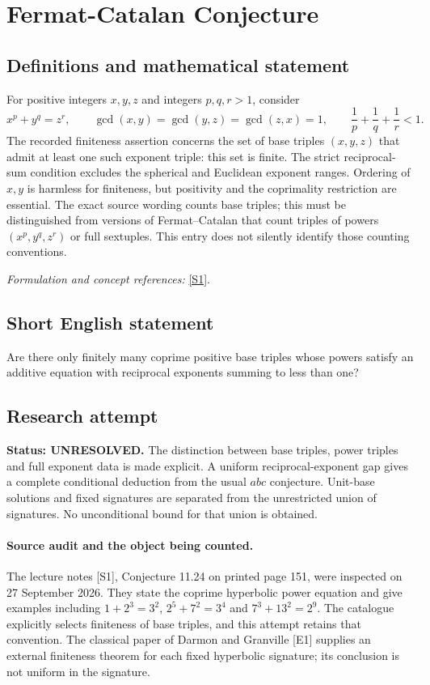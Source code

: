 \documentclass[11pt]{article}
\begin{document}
\section*{\texorpdfstring{Fermat-Catalan Conjecture}{Fermat-Catalan Conjecture}}\label{statement}
\subsection{Definitions and mathematical statement}
For positive integers $x,y,z$ and integers $p,q,r>1$, consider
\[
 x^p+y^q=z^r,\qquad
 \gcd(x,y)=\gcd(y,z)=\gcd(z,x)=1,
 \qquad\frac1p+\frac1q+\frac1r<1.
\]
The recorded finiteness assertion concerns the set of base triples $(x,y,z)$ that admit at least one such exponent triple: this set is finite. The strict reciprocal-sum condition excludes the spherical and Euclidean exponent ranges. Ordering of $x,y$ is harmless for finiteness, but positivity and the coprimality restriction are essential. The exact source wording counts base triples; this must be distinguished from versions of Fermat--Catalan that count triples of powers $(x^p,y^q,z^r)$ or full sextuples. This entry does not silently identify those counting conventions.
\par\smallskip\textit{Formulation and concept references:} \href{https://home.cit.tum.de/~wvi/NT.pdf}{[S1]}.

\subsection{Short English statement}
Are there only finitely many coprime positive base triples whose powers satisfy an additive equation with reciprocal exponents summing to less than one?
\subsection{Research attempt}
\textbf{Status: UNRESOLVED.} The distinction between base triples, power triples and full exponent data is made explicit. A uniform reciprocal-exponent gap gives a complete conditional deduction from the usual $abc$ conjecture. Unit-base solutions and fixed signatures are separated from the unrestricted union of signatures. No unconditional bound for that union is obtained.

\paragraph{Source audit and the object being counted.}
The lecture notes [S1], Conjecture 11.24 on printed page 151, were inspected on 27 September 2026. They state the coprime hyperbolic power equation and give examples including $1+2^3=3^2$, $2^5+7^2=3^4$ and $7^3+13^2=2^9$. The catalogue explicitly selects finiteness of base triples, and this attempt retains that convention. The classical paper of Darmon and Granville [E1] supplies an external finiteness theorem for each fixed hyperbolic signature; its conclusion is not uniform in the signature.
\end{document}
